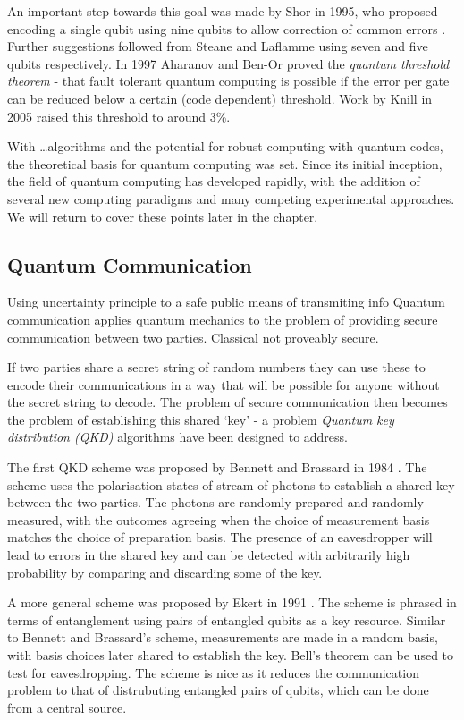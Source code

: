 An important step towards this goal was made by Shor in 1995, who proposed encoding a single qubit using nine qubits to allow correction of common errors \cite{shor_codes_95}. Further suggestions followed from Steane and Laflamme \cite{steane_code_96, steane_code_96_2, laflamme_5_code} using seven and five qubits respectively. In 1997 Aharanov and Ben-Or proved the \textit{quantum threshold theorem} - that fault tolerant quantum computing is possible if the error per gate can be reduced below a certain (code dependent) threshold. Work by Knill in 2005 \cite{knill_correction} raised this threshold to around 3\%. 

With \ldots algorithms and the potential for robust computing with quantum codes, the theoretical basis for quantum computing was set. Since its initial inception, the field of quantum computing has developed rapidly, with the addition of several new computing paradigms and many competing experimental approaches. We will return to cover these points later in the chapter.

\subsection{Quantum Communication}


Using uncertainty principle to a safe public means of transmiting info
Quantum communication applies quantum mechanics to the problem of providing secure communication between two parties. Classical not proveably secure.

If two parties share a secret string of random numbers they can use these to encode their communications in a way that will be possible for anyone without the secret string to decode. The problem of secure communication then becomes the problem of establishing this shared `key' - a problem \textit{Quantum key distribution (QKD)} algorithms have been designed to address.

The first QKD scheme was proposed by Bennett and Brassard in 1984 \cite{bennett_brassard_84}. The scheme uses the polarisation states of stream of photons to establish a shared key between the two parties. The photons are randomly prepared and randomly measured, with the outcomes agreeing when the choice of measurement basis matches the choice of preparation basis. The presence of an eavesdropper will lead to errors in the shared key and can be detected with arbitrarily high probability by comparing and discarding some of the key.

A more general scheme was proposed by Ekert in 1991 \cite{ekert_91}. The scheme is phrased in terms of entanglement using pairs of entangled qubits as a key resource. Similar to Bennett and Brassard's scheme, measurements are made in a random basis, with basis choices later shared to establish the key. Bell's theorem \cite{bells_theorem} can be used to test for eavesdropping. The scheme is nice as it reduces the communication problem to that of distrubuting entangled pairs of qubits, which can be done from a central source.

